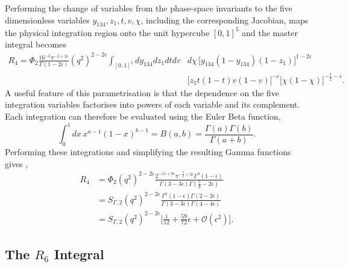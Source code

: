 Performing the change of variables from the phase-space invariants to the five dimensionless
variables $y_{134},z_1,t,v,\chi$, including the corresponding Jacobian, maps the physical
integration region onto the unit hypercube $[0,1]^5$ and the master integral becomes
\begin{equation}
    \begin{split}
        R_4 = \Phi_2\frac{16^{-2}\pi^{-5+2\epsilon}}{\Gamma(1-2\epsilon)}\!\left(q^2\right)^{2-2\epsilon}\int_{[0,1]^5}dy_{134}dz_1dtdv&d\chi\,\Big[y_{134}(1-y_{134})(1-z_1)\Big]^{1-2\epsilon}\\
                                                                                                                                                  &\Big[z_1t(1-t)v(1-v)\Big]^{-\epsilon}\Big[\chi(1-\chi)\Big]^{-\frac12-\epsilon}.
    \end{split}
\end{equation}
A useful feature of this parametrisation is that the dependence on the five integration
variables factorises into powers of each variable and its complement. Each integration can therefore be evaluated
using the Euler Beta function,
\begin{equation*}
    \int_0^1 dx\,x^{a-1}(1-x)^{b-1}=B(a,b)=\frac{\Gamma(a)\Gamma(b)}{\Gamma(a+b)}.
\end{equation*}
Performing these integrations and simplifying the resulting Gamma functions gives
\cite{Gehrmann-DeRidder:2005btv,GehrmannDeRidder0311276},
\begin{equation}
    \begin{split}
        R_4 &= \Phi_2\!\left(q^2\right)^{2-2\epsilon}\frac{2^{-11+8\epsilon}\pi^{-\frac72+2\epsilon}\Gamma^3(1-\epsilon)}{\Gamma(3-3\epsilon)\Gamma\!\left(\frac52-2\epsilon\right)}\\
            &= S_{\Gamma,2}\!\left(q^2\right)^{2-2\epsilon}\frac{\Gamma^5(1-\epsilon)\Gamma(2-2\epsilon)}{\Gamma(3-3\epsilon)\Gamma(4-4\epsilon)}\\
            &= S_{\Gamma,2}\!\left(q^2\right)^{2-2\epsilon}\Bigg[\frac1{12}+\frac{59}{72}\epsilon+\mathcal O\!\left(\epsilon^2\right)\Bigg].
    \end{split}
\end{equation}

\subsection{The $R_6$ Integral}

